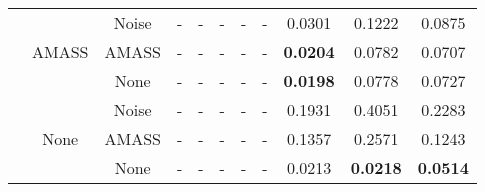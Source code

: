 \begin{table*}[t]
{\begin{tabular}{c|c|c|ccc|cc|ccc}
                          & \multirow{3}{*}{AMASS}                                                                         & Noise                       & -               & -               & -               & -               & -               & 0.0301 & 0.1222           & 0.0875           \\
                          &                                                                                                         & AMASS                       & -               & -               & -               & -               & -               & \textbf{0.0204} & 0.0782           & 0.0707           \\
                          &                                                                                                         & \multicolumn{1}{c}{None} & -               & -               & -               & -               & -               & \textbf{0.0198}         & 0.0778           & 0.0727           \\ \cmidrule{2-11}
                          & \multicolumn{1}{c}{\multirow{3}{*}{None}} & Noise                       & -               & -               & -               & -               & -               & 0.1931          & 0.4051           & 0.2283           \\
                          & \multicolumn{1}{c}{}                                                                                    & AMASS                       & -               & -               & -               & -               & -               & 0.1357          & 0.2571           & 0.1243           \\
                          & \multicolumn{1}{c}{}                                                                                    & \multicolumn{1}{c}{None} & -               & -               & -               & -               & -               & 0.0213 & \textbf{0.0218} & \textbf{0.0514} \\ \midrule


\end{tabular}}
\end{table*}
